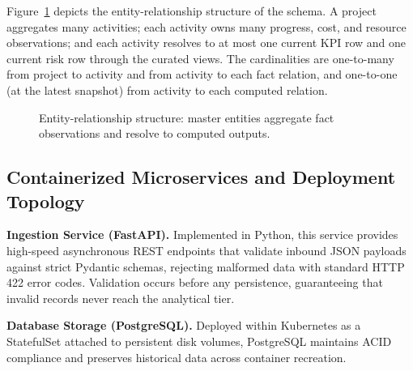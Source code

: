 \documentclass[conference]{IEEEtran}
\begin{document}
Figure~\ref{fig:er} depicts the entity-relationship structure of the schema. A project aggregates many activities; each activity owns many progress, cost, and resource observations; and each activity resolves to at most one current KPI row and one current risk row through the curated views. The cardinalities are one-to-many from project to activity and from activity to each fact relation, and one-to-one (at the latest snapshot) from activity to each computed relation.

\begin{figure}[t]
\centering
{}
\caption{Entity-relationship structure: master entities aggregate fact observations and resolve to computed outputs.}
\label{fig:er}
\end{figure}

\subsection{Containerized Microservices and Deployment Topology}

\textbf{Ingestion Service (FastAPI).} Implemented in Python, this service provides high-speed asynchronous REST endpoints that validate inbound JSON payloads against strict Pydantic schemas, rejecting malformed data with standard HTTP 422 error codes. Validation occurs before any persistence, guaranteeing that invalid records never reach the analytical tier.

\textbf{Database Storage (PostgreSQL).} Deployed within Kubernetes as a StatefulSet attached to persistent disk volumes, PostgreSQL maintains ACID compliance and preserves historical data across container recreation.
\end{document}
